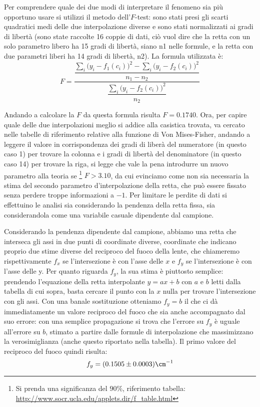 Per comprendere quale dei due modi di interpretare il fenomeno sia più opportuno usare si utilizzi il metodo dell'$F$-test:
 sono stati presi gli scarti quadratici medi delle due interpolazione diverse e sono stati normalizzati ai gradi di libertà
 (sono state raccolte 16 coppie di dati, ciò vuol dire che la retta con un solo parametro libero ha 15 gradi di libertà,
 siano n1 nelle formule, e la retta con due parametri liberi ha 14 gradi di libertà, n2).
 La formula utilizzata è:
\[F=\frac{\dfrac{{\sum_i \big( y_i-f_1 (c_i) \big) ^2} - {\sum_i \big( y_i-f_2 (c_i) \big) ^2}}{n_1-n_2}}{\dfrac{\sum_i \big( y_i-f_2 
(c_i) \big) ^2}{n_2}}\]

Andando a calcolare la $F$ da questa formula risulta $F = 0.1740$. Ora, per capire quale delle due interpolazioni meglio si addice alla
 casistica trovata, va cercato nelle tabelle di riferimento relative alla funzione di Von Mises-Fisher, andando a leggere il valore
 in corrispondenza dei gradi di liberà del numeratore (in questo caso 1) per trovare la colonna e i gradi di libertà del denominatore
 (in questo caso 14) per trovare la riga, si legge che vale la pena introdurre un nuovo parametro alla teoria 
 se \footnote{Si prenda una significanza del $90\%$, riferimento tabella: \url{http://www.socr.ucla.edu/applets.dir/f_table.html}} $F > 3.10$, 
 da cui evinciamo come non sia necessaria la stima del secondo parametro d'interpolazione della retta, che può essere fissato senza perdere
 troppe informazioni a $-1$. Per limitare le perdite di dati si effettuino le analisi sia considerando la pendenza della retta fissa,
 sia considerandola come una variabile casuale dipendente dal campione.

Considerando la pendenza dipendente dal campione, abbiamo una retta che interseca gli assi in due punti di coordinate diverse,
 coordinate che indicano proprio due stime diverse del reciproco del fuoco della lente, che chiameremo rispettivamente
$f_x$ se l'intersezione è con l'asse delle $x$ e $f_y$ se l'intersezione è con l'asse delle y.
 Per quanto riguarda $f_y$, la sua stima è piuttosto semplice: prendendo l'equazione della retta interpolante $y=ax + b$
 con $a$ e $b$ letti dalla tabella di cui sopra, basta cercare il punto con la $x$ nulla per trovare l'intersezione con gli assi.
 Con una banale sostituzione otteniamo $f_y= b$ il che ci dà immediatamente un valore reciproco del fuoco che sia anche
 accompagnato dal suo errore: con una semplice propagazione si trova che l'errore su $f_y$ è uguale all'errore su $b$,
 stimato a partire dalle formule di interpolazione che massimizzano la verosimiglianza (anche questo riportato nella tabella).
 Il primo valore del reciproco del fuoco quindi risulta:
\[f_y = (0.1505 \pm 0.0003) \cm^{-1}\]

